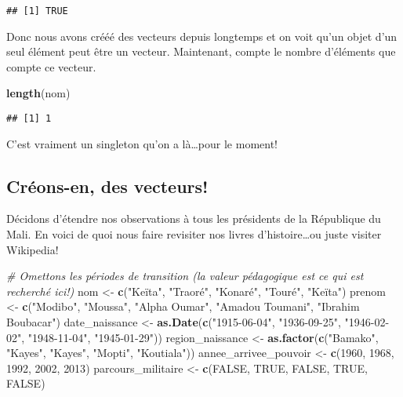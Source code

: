 \documentclass[]{book}
\newenvironment{Shaded}{\begin{snugshade}}{\end{snugshade}}
\newcommand{\KeywordTok}[1]{\textcolor[rgb]{0.13,0.29,0.53}{\textbf{#1}}}
\newcommand{\DecValTok}[1]{\textcolor[rgb]{0.00,0.00,0.81}{#1}}
\newcommand{\StringTok}[1]{\textcolor[rgb]{0.31,0.60,0.02}{#1}}
\newcommand{\CommentTok}[1]{\textcolor[rgb]{0.56,0.35,0.01}{\textit{#1}}}
\newcommand{\OtherTok}[1]{\textcolor[rgb]{0.56,0.35,0.01}{#1}}
\newcommand{\NormalTok}[1]{#1}
\begin{document}
\begin{verbatim}
## [1] TRUE
\end{verbatim}

Donc nous avons crééé des vecteurs depuis longtemps et on voit qu'un
objet d'un seul élément peut être un vecteur. Maintenant, compte le
nombre d'éléments que compte ce vecteur.

\begin{Shaded}
\begin{Highlighting}[]
\KeywordTok{length}\NormalTok{(nom)}
\end{Highlighting}
\end{Shaded}

\begin{verbatim}
## [1] 1
\end{verbatim}

C'est vraiment un singleton qu'on a là\ldots{}pour le moment!

\subsection{Créons-en, des vecteurs!}\label{creons-en-des-vecteurs}

Décidons d'étendre nos observations à tous les présidents de la
République du Mali. En voici de quoi nous faire revisiter nos livres
d'histoire\ldots{}ou juste visiter Wikipedia!

\begin{Shaded}
\begin{Highlighting}[]
\CommentTok{# Omettons les périodes de transition (la valeur pédagogique est ce qui est recherché ici!)}
\NormalTok{nom <-}\StringTok{ }\KeywordTok{c}\NormalTok{(}\StringTok{"Keïta"}\NormalTok{, }\StringTok{"Traoré"}\NormalTok{, }\StringTok{"Konaré"}\NormalTok{, }\StringTok{"Touré"}\NormalTok{, }\StringTok{"Keïta"}\NormalTok{)}
\NormalTok{prenom <-}\StringTok{ }\KeywordTok{c}\NormalTok{(}\StringTok{"Modibo"}\NormalTok{, }\StringTok{"Moussa"}\NormalTok{, }\StringTok{"Alpha Oumar"}\NormalTok{, }\StringTok{"Amadou Toumani"}\NormalTok{, }\StringTok{"Ibrahim Boubacar"}\NormalTok{)}
\NormalTok{date_naissance <-}\StringTok{ }\KeywordTok{as.Date}\NormalTok{(}\KeywordTok{c}\NormalTok{(}\StringTok{"1915-06-04"}\NormalTok{, }\StringTok{"1936-09-25"}\NormalTok{, }\StringTok{"1946-02-02"}\NormalTok{, }\StringTok{"1948-11-04"}\NormalTok{, }\StringTok{"1945-01-29"}\NormalTok{))}
\NormalTok{region_naissance <-}\StringTok{ }\KeywordTok{as.factor}\NormalTok{(}\KeywordTok{c}\NormalTok{(}\StringTok{"Bamako"}\NormalTok{, }\StringTok{"Kayes"}\NormalTok{, }\StringTok{"Kayes"}\NormalTok{, }\StringTok{"Mopti"}\NormalTok{, }\StringTok{"Koutiala"}\NormalTok{))}
\NormalTok{annee_arrivee_pouvoir <-}\StringTok{ }\KeywordTok{c}\NormalTok{(}\DecValTok{1960}\NormalTok{, }\DecValTok{1968}\NormalTok{, }\DecValTok{1992}\NormalTok{, }\DecValTok{2002}\NormalTok{, }\DecValTok{2013}\NormalTok{)}
\NormalTok{parcours_militaire <-}\StringTok{ }\KeywordTok{c}\NormalTok{(}\OtherTok{FALSE}\NormalTok{, }\OtherTok{TRUE}\NormalTok{, }\OtherTok{FALSE}\NormalTok{, }\OtherTok{TRUE}\NormalTok{, }\OtherTok{FALSE}\NormalTok{)}
\end{Highlighting}
\end{Shaded}
\end{document}
